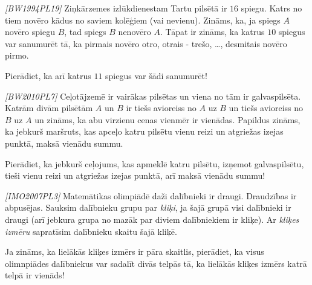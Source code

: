 



\renewcommand{\theenumi}{\alph{enumi}}



\noindent
 
\filbreak

\begin{problem}
\textit{[BW1994PL19]}
Ziņkārzemes izlūkdienestam Tartu pilsētā ir $16$ spiegu. Katrs no tiem novēro kādus no saviem kolēģiem (vai nevienu). Zināms, ka, ja spiegs $A$ novēro spiegu $B$, tad spiegs $B$ nenovēro $A$. Tāpat ir zināms, ka katrus $10$ spiegus var sanumurēt tā, ka pirmais novēro otro, otrais - trešo, \dots, desmitais novēro pirmo.

Pierādiet, ka arī katrus $11$ spiegus var šādi sanumurēt!
\end{problem}
%

\begin{problem}
\textit{[BW2010PL7]}
Ceļotājzemē ir vairākas pilsētas un viena no tām ir galvaspilsēta. Katrām divām pilsētām $A$ un $B$ ir tiešs avioreiss no $A$ uz $B$ un tiešs avioreiss no $B$ uz $A$ un zināms, ka abu virzienu cenas vienmēr ir vienādas. Papildus zināms, ka jebkurš maršruts, kas apceļo katru pilsētu vienu reizi un atgriežas izejas punktā, maksā vienādu summu.

Pierādiet, ka jebkurš ceļojums, kas apmeklē katru pilsētu, izņemot galvaspilsētu, tieši vienu reizi un atgriežas izejas punktā, arī maksā vienādu summu!
\end{problem}
%

\begin{problem}
\textit{[IMO2007PL3]}
Matemātikas olimpiādē daži dalībnieki ir draugi. Draudzības ir abpusējas. Sauksim dalībnieku grupu par \textit{kliķi}, ja šajā grupā visi dalībnieki ir draugi (arī jebkura grupa no mazāk par diviem dalībniekiem ir kliķe). Ar \textit{kliķes izmēru} sapratīsim dalībnieku skaitu šajā kliķē.

Ja zināms, ka lielākās kliķes izmērs ir pāra skaitlis, pierādiet, ka visus olimnpiādes dalībniekus var sadalīt divās telpās tā, ka lielākās kliķes izmērs katrā telpā ir vienāds!
\end{problem}
%

